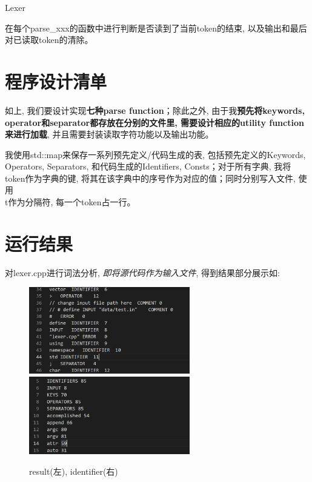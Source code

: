 \documentclass{zpt}
\begin{document}
    \begin{algorithm}[H]
        \caption{Lexer}
    \end{algorithm}
    在每个parse\_xxx的函数中进行判断是否读到了当前token的结束, 以及输出和最后对已读取token的清除。
    \section{程序设计清单}
    如上, 我们要设计实现\textbf{七种parse function}；除此之外, 由于我\textbf{预先将keywords, operator和separator都存放在分别的文件里, 需要设计相应的utility function来进行加载}, 并且需要封装读取字符功能以及输出功能。\par
    我使用std::map来保存一系列预先定义/代码生成的表, 包括预先定义的Keywords, Operators, Separators, 和代码生成的Identifiers, Consts；对于所有字典, 我将token作为字典的键, 将其在该字典中的序号作为对应的值；同时分别写入文件, 使用\\t作为分隔符, 每一个token占一行。
    \section{运行结果}
    对lexer.cpp进行词法分析, \emph{即将源代码作为输入文件}, 得到结果部分展示如:
    \begin{figure}
        \centering
        \includegraphics[width=7cm]{result.png}
        \includegraphics[width=7cm]{identifiers.png}
        \caption{result(左), identifier(右)}
        \label{f1}
    \end{figure}
\end{document}

